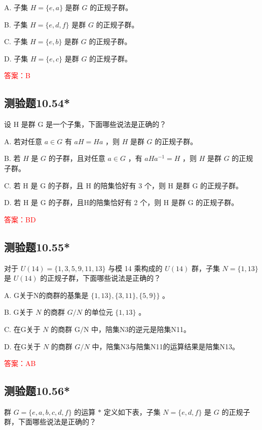 \documentclass[UTF8, heading=true]{ctexart}
\begin{document}
A. 子集 $H=\{e, a\}$ 是群 $G$ 的正规子群。

B. 子集 $H=\{e, d, f\}$ 是群 $G$ 的正规子群。

C. 子集 $H=\{e, b\}$ 是群 $G$ 的正规子群。

D. 子集 $H=\{e, c\}$ 是群 $G$ 的正规子群。

\textcolor{red}{答案：B}

\subsection{测验题10.54*}

设 H 是群 G 是一个子集，下面哪些说法是正确的？

A. 若对任意 $a \in G$ 有 $a H=H a$ ，则 $H$ 是群 $G$ 的正规子群。

B. 若 $H$ 是 $G$ 的子群，且对任意 $a \in G$ ，有 $a H a^{-1}=H$ ，则 $H$ 是群 $G$ 的正规子群。

C. 若 H 是 G 的子群，且 H 的陪集恰好有 3 个，则 H 是群 G 的正规子群。

D. 若 H 是 G 的子群，且H的陪集恰好有 2 个，则 H 是群 G 的正规子群。

\textcolor{red}{答案：BD}


\subsection{测验题10.55*}

对于 $U(14)=\{1,3,5,9,11,13\}$ 与模 14 乘构成的 $U(14)$ 群，子集 $N=\{1,13\}$ 是 $U(14)$ 的正规子群，下面哪些说法是正确的？

A. G关于N的商群的基集是 $\{1,13\},\{3,11\},\{5,9\}\}$ 。

B. G关于 $N$ 的商群 $G / N$ 的单位元 $\{1,13\}$ 。

C. 在G关于 $N$ 的商群 $\mathrm{G} / \mathrm{N}$ 中，陪集N3的逆元是陪集N11。

D. 在G关于 $N$ 的商群 $G / N$ 中，陪集N3与陪集N11的运算结果是陪集N13。

\textcolor{red}{答案：AB}

\subsection{测验题10.56*}

群 $G=\{e, a, b, c, d, f\}$ 的运算 $*$ 定义如下表，子集 $N=\{e, d, f\}$ 是 $G$ 的正规子群，下面哪些说法是正确的？
\end{document}
